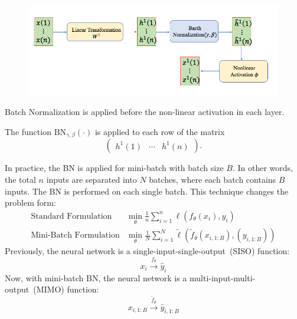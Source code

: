 \begin{figure}[H]
\centering
\includegraphics[width=\textwidth]{Forth_lecture/f_5}
\end{figure}
\begin{remark}
Batch Normalization is applied before the non-linear activation in each layer.
\end{remark}
\begin{remark}
The function $\text{BN}_{\gamma,\beta}(\cdot)$ is applied to each row of the matrix
\[
\begin{pmatrix}
h^1(1)&\cdots&h^1(n)
\end{pmatrix}.
\]
\end{remark}
\begin{remark}
In practice, the BN is applied for mini-batch with batch size $B$. 
In other words, the total $n$ inputs are separated into $N$ batches, where each batch contains $B$ inputs. The BN is performed on each single batch.
This technique changes the problem form:
\[
\begin{array}{ll}
\mbox{Standard Formulation}&\min_{\theta}\frac{1}{n}\sum_{i=1}^n\ell(f_\theta(x_i),y_i)\\
\mbox{Mini-Batch Formulation}&\min_{\theta}\frac{1}{N}\sum_{i=1}^N\tilde{\ell}(\tilde{f}_\theta(x_{i,1:B}),(y_{i,1:B}))
\end{array}
\]
Previously, the neural network is a single-input-single-output~(SISO) function:
\[
x_i\xrightarrow{f_{\theta}}\hat{y}_i
\]
Now, with mini-batch BN, the neural network is a multi-input-multi-output~(MIMO) function:
\[
x_{i,1:B}\xrightarrow{\tilde{f}_{\theta}}\hat{y}_{i,1:B}
\]
\end{remark}

